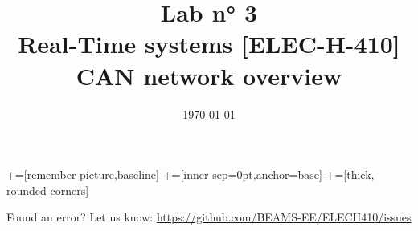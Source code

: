 \documentclass[10pt,a4paper]{article}
\date{\vspace{-1cm}\mydate\today}
\title{\vspace{-2cm} Lab n° 3\\ Real-Time systems [ELEC-H-410]\\ CAN network overview\ifthenelse{\boolean{corrige}}{~\\Corrigé}{}}
\theoremstyle{definition}%
\begin{document}
    \newcommand\tabnode[1]{\addtocounter{nodecount}{1} \tikz \node (\arabic{nodecount}) {#1};}
    
    +=[remember picture,baseline]
    +=[inner sep=0pt,anchor=base]
    +=[thick, rounded corners]
    

    \maketitle
    

    \vfill
    \footnotesize{
        Found an error? Let us know: \url{https://github.com/BEAMS-EE/ELECH410/issues}
    }
\end{document}
